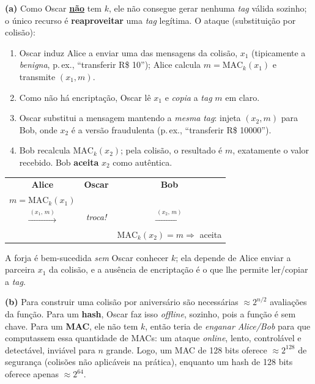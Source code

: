 \documentclass[11pt,a4paper]{article}
\newcommand{\alert}[1]{\textbf{\uline{#1}}}
\newenvironment{resposta}{%
    \begin{respostabox}
    \color{red!70!black}\sloppy
}{%
    \end{respostabox}
}
\begin{document}
\begin{resposta}
\textbf{(a)} Como Oscar \alert{n\~{a}o} tem $k$, ele n\~{a}o consegue gerar nenhuma \textit{tag} v\'{a}lida sozinho; o \'{u}nico recurso \'{e} \textbf{reaproveitar} uma \textit{tag} leg\'{i}tima. O ataque (substitui\c{c}\~{a}o por colis\~{a}o):
\begin{enumerate}[label=\arabic*., topsep=1pt]
    \item Oscar induz Alice a enviar uma das mensagens da colis\~{a}o, $x_1$ (tipicamente a \emph{benigna}, p.\,ex., ``transferir R\$ 10''); Alice calcula $m = \text{MAC}_k(x_1)$ e transmite $(x_1, m)$.
    \item Como n\~{a}o h\'{a} encripta\c{c}\~{a}o, Oscar l\^{e} $x_1$ e \emph{copia} a \textit{tag} $m$ em claro.
    \item Oscar substitui a mensagem mantendo a \emph{mesma} \textit{tag}: injeta $(x_2, m)$ para Bob, onde $x_2$ \'{e} a vers\~{a}o fraudulenta (p.\,ex., ``transferir R\$ 10000'').
    \item Bob recalcula $\text{MAC}_k(x_2)$; pela colis\~{a}o, o resultado \'{e} $m$, exatamente o valor recebido. Bob \textbf{aceita} $x_2$ como aut\^{e}ntica.
\end{enumerate}
\begin{center}\footnotesize
\begin{tabular}{ccc}
\textbf{Alice} & \textbf{Oscar} & \textbf{Bob}\\
$m = \text{MAC}_k(x_1)$ & & \\
$\xrightarrow{\ (x_1,\, m)\ }$ & \emph{troca!} & $\xrightarrow{\ (x_2,\, m)\ }$ \\
& & $\text{MAC}_k(x_2) = m \Rightarrow$ aceita
\end{tabular}
\end{center}
A forja \'{e} bem-sucedida \emph{sem} Oscar conhecer $k$; ela depende de Alice enviar a parceira $x_1$ da colis\~{a}o, e a aus\^{e}ncia de encripta\c{c}\~{a}o \'{e} o que lhe permite ler/copiar a \textit{tag}.

\textbf{(b)} Para construir uma colis\~{a}o por anivers\'{a}rio s\~{a}o necess\'{a}rias $\approx 2^{n/2}$ avalia\c{c}\~{o}es da fun\c{c}\~{a}o. Para um \textbf{hash}, Oscar faz isso \emph{offline}, sozinho, pois a fun\c{c}\~{a}o \'{e} sem chave. Para um \textbf{MAC}, ele n\~{a}o tem $k$, ent\~{a}o teria de \emph{enganar Alice/Bob} para que computassem essa quantidade de MACs: um ataque \emph{online}, lento, control\'{a}vel e detect\'{a}vel, invi\'{a}vel para $n$ grande. Logo, um MAC de 128 bits oferece $\approx 2^{128}$ de seguran\c{c}a (colis\~{o}es n\~{a}o aplic\'{a}veis na pr\'{a}tica), enquanto um hash de 128 bits oferece apenas $\approx 2^{64}$.
\end{resposta}
\end{document}
